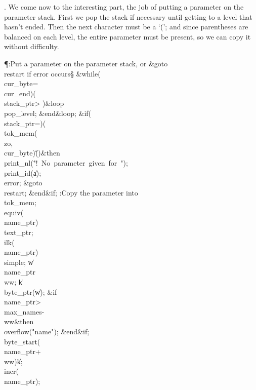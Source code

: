 . We come now to the interesting part, the job of putting a parameter on
the parameter stack. First we pop the stack if necessary until getting to
a level that hasn't ended. Then the next character must be a `\.(';
and since parentheses are balanced on each level, the entire parameter must
be present, so we can copy it without difficulty.

\Y\P\?\4:Put a parameter on the parameter stack, or \&{goto}\8\\{restart}
if error occurs\X\S\?\6
\1\&{while}\?\8\1(\?\\{cur\_byte}\?=\?\\{cur\_end}\?\2)\W\1(\?\\{stack\_ptr}\?>%
\?\2)\?\8\&{loop}\6
\\{pop\_level};\2\6
\&{end}\8\&{loop};\6
\&{if}\1\1\?\8\1(\?\\{stack\_ptr}\?=\?\2)\V\1(\?\\{tok\_mem}\?\1(\?\\{zo}\?,%
\?\\{cur\_byte}\?\2)\I\?\H{(}\?\2)\?\2\8\&{then}\6
\\{print\_nl}\?\1(\?\.{"!\ No\ parameter\ given\ for\ "}\?\2)\?;\5
\\{print\_id}\?\1(\?\|a\?\2)\?;\5
\\{error};\5
\&{goto}\8\\{restart};\2\6
\&{end}\8\2\&{if}\1;\6
:Copy the parameter into \\{tok\_mem}\X;\6
\\{equiv}\?\1(\?\\{name\_ptr}\?\2)\K\?\\{text\_ptr};\5
\\{ilk}\?\1(\?\\{name\_ptr}\?\2)\K\?\\{simple};\5
\|w\?\K\?\\{name\_ptr}\?\?\\{ww};\5
\|k\?\K\?\\{byte\_ptr}\?\1(\?\|w\?\2)\?;\6
\&{if}\1\1\8\\{name\_ptr}\?>\?\\{max\_names}\?-\?\\{ww}\2\8\&{then}\6
\\{overflow}\?\1(\?\.{"name"}\?\2)\?;\2\6
\&{end}\8\2\&{if}\1;\6
\\{byte\_start}\?\1(\?\\{name\_ptr}\?+\?\\{ww}\?\2)\K\?\|k;\5
\\{incr}\?\1(\?\\{name\_ptr}\?\2)\?;\6
